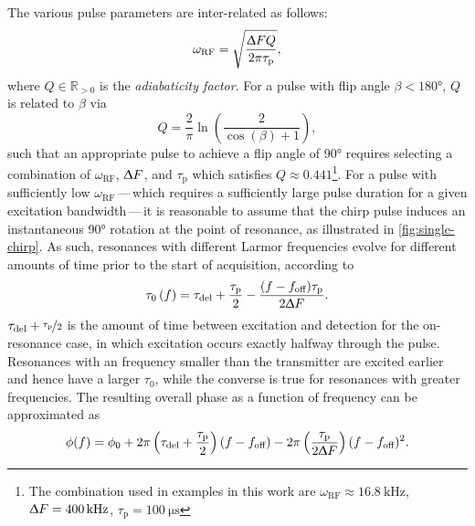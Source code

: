 The various pulse parameters are inter-related as
follows\cite{Foroozandeh2019,Kupce1995b}:
\begin{equation}
    \omega_{\text{RF}} = \sqrt{
        \frac{\Updelta F Q}{2 \pi \tau_{\text{p}}}
    },
\end{equation}
where $Q \in \mathbb{R}_{>0}$ is the \emph{adiabaticity factor}.
For a pulse with flip angle  $\beta < \ang{180}$, $Q$ is related to $\beta$ via
\begin{equation}
    Q = \frac{2}{\pi} \ln \left( \frac{2}{\cos(\beta) + 1} \right),
\end{equation}
such that an appropriate pulse to achieve a flip angle of \ang{90} requires
selecting a combination of $\omega_{\text{RF}}$, $\Updelta F$, and
$\tau_{\text{p}}$ which satisfies $Q \approx 0.441$\footnote{
    The combination used in examples in this work are
    $\omega_{\text{RF}} \approx \qty{16.8}{\kilo\hertz}$,
    $\Updelta F = \qty{400}{\kilo\hertz}$,
    $\tau_{\text{p}} = \qty{100}{\micro\second}$
}.
For a pulse with sufficiently low $\omega_{\text{RF}}$\,---\,which requires a
sufficiently large pulse duration for a given excitation bandwidth\,---\,it is
reasonable to assume that the chirp pulse induces an instantaneous \ang{90}
rotation at the point of resonance, as illustrated in
\cref{fig:single-chirp}. As such, resonances with different
Larmor frequencies evolve for different amounts of time prior to the start of
acquisition, according to
\begin{equation}
    \tau_0\left(f\right) =
        \tau_{\text{del}} + \frac{\tau_{\text{p}}}{2} -
        \frac{(f - f_{\text{off}}) \tau_{\text{p}}}{2 \Updelta F}.
    \label{eq:t0}
\end{equation}
$\tau_{\text{del}} + \nicefrac{\tau_{\text{p}}}{2}$ is the amount of time
between excitation and detection for the on-resonance case, in which
excitation occurs exactly halfway through the pulse. Resonances
with an frequency smaller than the transmitter are excited earlier and hence
have a larger $\tau_0$, while the converse is true for resonances with greater
frequencies. The resulting overall phase as a function of frequency can be
approximated as\cite{Foroozandeh2019}
\begin{equation}
    \phi(f) = \phi_0 + 2 \pi \left(\tau_{\text{del}} + \frac{\tau_{\text{p}}}{2} \right) (f - f_{\text{off}}) -
        2 \pi \left(\frac{\tau_{\text{p}}}{2 \Updelta F}\right)
        (f - f_{\text{off}})^2.
    \label{eq:quadratic-phase}
\end{equation}
